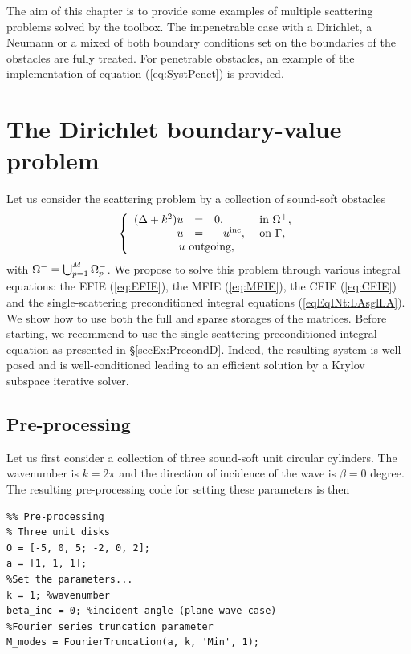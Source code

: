 The aim of this chapter is to provide some examples of multiple scattering problems solved by  the \mudiff toolbox.
The impenetrable case with a Dirichlet, a Neumann or a mixed of both boundary conditions set on the boundaries of the obstacles are
fully treated. For penetrable obstacles, an example of the implementation of equation (\ref{eq:SystPenet}) is provided.


\section{The Dirichlet boundary-value problem}

Let us consider the scattering problem by a collection of sound-soft obstacles
$$
\left\{\begin{array}{r c l l}
(\Delta +k^2)u & = & 0, & \text{ in }\Omegaps,\\
u & = & -\uinc, & \text{ on }\Gamma,\\
\multicolumn{4}{l}{\qquad \qquad u \text{ outgoing},}
\end{array}\right.
$$
with  $\Omega^- = \bigcup_{p=1}^{M}\Omega_p^-$.
We propose to solve this problem through various integral equations: the EFIE (\ref{eq:EFIE}), the MFIE (\ref{eq:MFIE}), the 
CFIE (\ref{eq:CFIE}) and the single-scattering preconditioned integral equations (\ref{eqEqINt:LAsglLA}). We show how
 to use both the full and  sparse storages of the matrices.
Before starting, we recommend to use the  single-scattering preconditioned integral equation as presented in \S\ref{secEx:PrecondD}. 
Indeed, the resulting system is well-posed and is well-conditioned leading to an efficient solution by a Krylov subspace iterative solver.

\subsection{Pre-processing}

Let us first consider a collection of three sound-soft unit circular cylinders. The  wavenumber is 
$k=2\pi$ and the direction of  incidence of the
 wave is $\beta = 0$ degree. The resulting  \mudiff pre-processing code for setting  these parameters is then
\begin{lstlisting}
%% Pre-processing
% Three unit disks 
O = [-5, 0, 5; -2, 0, 2];
a = [1, 1, 1];
%Set the parameters...
k = 1; %wavenumber
beta_inc = 0; %incident angle (plane wave case)
%Fourier series truncation parameter
M_modes = FourierTruncation(a, k, 'Min', 1);
\end{lstlisting}

